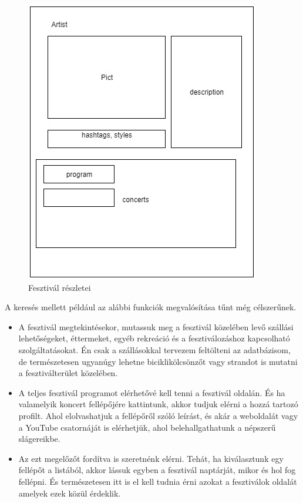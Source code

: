 \begin{figure}
\centering
\includegraphics[scale=0.5]{kepek/artist_details.jpg}
\caption{Fesztivál részletei}
\label{fig:artist_details}
\end{figure}


A keresés mellett például az alábbi funkciók megvalósítása tűnt még célszerűnek.
\begin{itemize}
\item A fesztivál megtekintésekor, mutassuk meg a fesztivál közelében levő szállási lehetőségeket, éttermeket, egyéb rekreáció és a fesztiválozáshoz kapcsolható szolgáltatásokat. Én csak a szállásokkal tervezem feltölteni az adatbázisom, de természetesen ugyanúgy lehetne biciklikölcsönzőt vagy strandot is mutatni a fesztiválterület közelében.
\item A teljes fesztivál programot elérhetővé kell tenni a fesztivál oldalán. És ha valamelyik koncert fellépőjére kattintunk, akkor tudjuk elérni a hozzá tartozó profilt. Ahol elolvashatjuk a fellépőről szóló leírást, és akár a weboldalát vagy a YouTube csatornáját is elérhetjük, ahol belehallgathatunk a népszerű slágereikbe.
\item Az ezt megelőzőt fordítva is szeretnénk elérni. Tehát, ha kiválasztunk egy fellépőt a listából, akkor lássuk egyben a fesztivál naptárját, mikor és hol fog fellépni. És természetesen itt is el kell tudnia érni azokat a fesztiválok oldalát amelyek ezek közül érdeklik.
\end{itemize}

